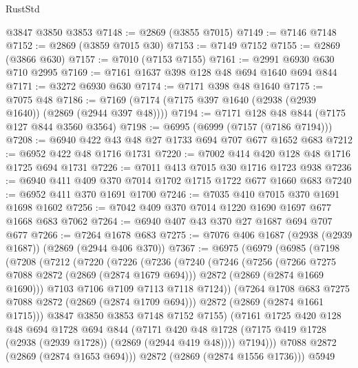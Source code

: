 \begin{lexlean}{RustStd}
\begin{coremodule}
    @3847
    @3850
    @3853
@7148 := @2869 (@3855 @7015)
@7149 := @7146 @7148
@7152 := @2869 (@3859 @7015 @30)
@7153 := @7149 @7152
@7155 := @2869 (@3866 @630)
@7157 := @7010 (@7153 @7155)
@7161 := @2991 @6930 @630 @710 @2995
@7169 := @7161 @1637 @398 @128 @48 @694 @1640 @694 @844
@7171 := @3272 @6930 @630
@7174 := @7171 @398 @48 @1640
@7175 := @7075 @48
@7186 := @7169 (@7174 (@7175 @397 @1640 (@2938 (@2939 @1640)) (@2869 (@2944 @397 @48))))
@7194 := @7171 @128 @48 @844 (@7175 @127 @844 @3560 @3564)
@7198 := @6995 (@6999 (@7157 (@7186 @7194)))
@7208 := @6940 @422 @43 @48 @27 @1733 @694 @707 @677 @1652 @683
@7212 := @6952 @422 @48 @1716 @1731
@7220 := @7002 @414 @420 @128 @48 @1716 @1725 @694 @1731
@7226 := @7011 @413 @7015 @30 @1716 @1723 @938
@7236 := @6940 @411 @409 @370 @7014 @1702 @1715 @1722 @677 @1660 @683
@7240 := @6952 @411 @370 @1691 @1700
@7246 := @7035 @410 @7015 @370 @1691 @1698 @1602
@7256 := @7042 @409 @370 @7014 @1220 @1690 @1697 @677 @1668 @683 @7062
@7264 := @6940 @407 @43 @370 @27 @1687 @694 @707 @677
@7266 := @7264 @1678 @683
@7275 := @7076 @406 @1687 (@2938 (@2939 @1687)) (@2869 (@2944 @406 @370))
@7367 := @6975
    (@6979
      (@6985
        (@7198
          (@7208
            (@7212
              (@7220
                (@7226
                  (@7236
                    (@7240
                      (@7246
                        (@7256
                          (@7266 @7275 @7088 @2872 (@2869 (@2874 @1679 @694)))
                          @2872
                          (@2869 (@2874 @1669 @1690)))
                        @7103
                        @7106
                        @7109
                        @7113
                        @7118
                        @7124))
                    (@7264 @1708 @683 @7275 @7088 @2872 (@2869 (@2874 @1709 @694)))
                    @2872
                    (@2869 (@2874 @1661 @1715)))
                  @3847
                  @3850
                  @3853
                  @7148
                  @7152
                  @7155)
                (@7161
                  @1725
                  @420
                  @128
                  @48
                  @694
                  @1728
                  @694
                  @844
                  (@7171
                    @420
                    @48
                    @1728
                    (@7175 @419 @1728 (@2938 (@2939 @1728)) (@2869 (@2944 @419 @48))))
                  @7194)))
            @7088
            @2872
            (@2869 (@2874 @1653 @694)))
          @2872
          (@2869 (@2874 @1556 @1736)))
        @5949

\end{coremodule}
\end{lexlean}
